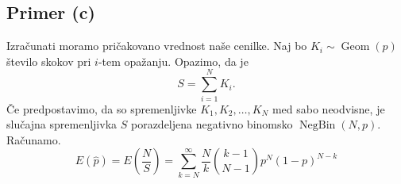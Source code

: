 \documentclass[a4paper,11pt]{article}
\DeclareMathOperator{\Geom}{Geom}
\DeclareMathOperator{\NegBin}{NegBin}
\begin{document}
\subsection*{Primer (c)}

Izračunati moramo pričakovano vrednost naše cenilke.
Naj bo $K_i \sim \Geom(p)$ število skokov pri $i$-tem opažanju. Opazimo, da je
\[S = \sum_{i=1}^N K_i.\]
Če predpostavimo, da so spremenljivke $K_1, K_2, \ldots, K_N$ med sabo neodvisne, 
je slučajna spremenljivka $S$ porazdeljena negativno binomsko $\NegBin(N,p)$.
Računamo.
\[E(\hat{p}) = E(\frac{N}{S}) = \sum_{k=N}^{\infty} \frac{N}{k} \binom{k-1}{N-1}p^N(1-p)^{N-k}\]  





\end{document}

